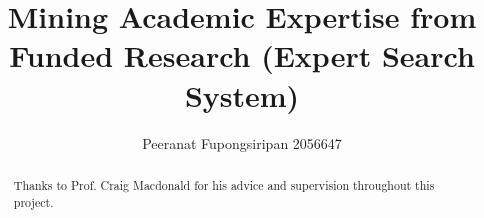 \documentclass[a4paper,10pt]{article}
\title{Mining Academic Expertise from Funded Research (Expert Search System)}
\author{Peeranat Fupongsiripan 2056647}
\begin{document}
\maketitle

\begin{abstract}

\end{abstract}


\renewcommand{\abstractname}{Acknowledgements}
\begin{abstract}
Thanks to Prof. Craig Macdonald for his advice and supervision throughout this project. 
\end{abstract}

\tableofcontents







\end{document}
